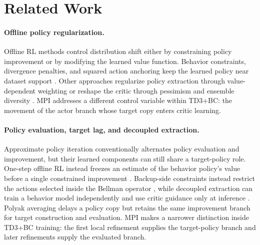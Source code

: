 \section{Related Work}
\label{sec:related}

\paragraph{Offline policy regularization.}
Offline RL methods control distribution shift either by constraining policy
improvement or by modifying the learned value function. Behavior constraints,
divergence penalties, and squared action anchoring keep the learned policy near
dataset support
\citep{fujimoto2019offpolicy,kumar2019bear,wu2019brac,fujimoto2021minimalist,tarasov2023revisiting}.
Other approaches regularize policy extraction through value-dependent
weighting or reshape the critic through pessimism and ensemble diversity
\citep{nair2020awac,kostrikov2022iql,kumar2020cql,an2021edac}. MPI addresses a
different control variable within TD3+BC: the movement of the actor branch
whose target copy enters critic learning.

\paragraph{Policy evaluation, target lag, and decoupled extraction.}
Approximate policy iteration conventionally alternates policy evaluation and
improvement, but their learned components can still share a target-policy
role. One-step offline RL instead freezes an estimate of the behavior policy's
value before a single constrained improvement
\citep{brandfonbrener2021onestep}. Backup-side constraints instead restrict
the actions selected inside the Bellman operator
\citep{kumar2019bear,ghasemipour2021emaq}, while decoupled extraction can train
a behavior model independently and use critic guidance only at inference
\citep{lin2026decoupling}. Polyak averaging delays a policy copy but retains
the same improvement branch for target construction and evaluation. MPI makes
a narrower distinction inside TD3+BC training: the first local refinement
supplies the target-policy branch and later refinements supply the evaluated
branch.

